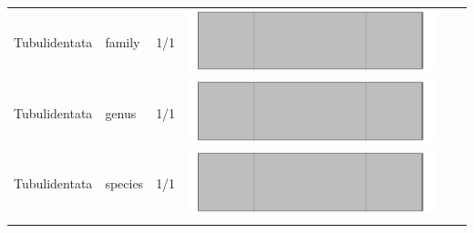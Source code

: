 \begin{longtable}{lL{1.8cm}C{2cm}lcc}
  Tubulidentata & family & 1/1 & \includegraphics[width=0.20\linewidth, height=0.05\linewidth]{Supplementaries/Figures/MissingMammals/Results_1c/Table_figures/bar82.pdf} &   &   \\ 
  Tubulidentata & genus & 1/1 & \includegraphics[width=0.20\linewidth, height=0.05\linewidth]{Supplementaries/Figures/MissingMammals/Results_1c/Table_figures/bar83.pdf} &   &   \\ 
  Tubulidentata & species & 1/1 & \includegraphics[width=0.20\linewidth, height=0.05\linewidth]{Supplementaries/Figures/MissingMammals/Results_1c/Table_figures/bar84.pdf} &   &   \\ 
   \hline
\hline
\label{MissingMammals_Supp_table}
\end{longtable}
